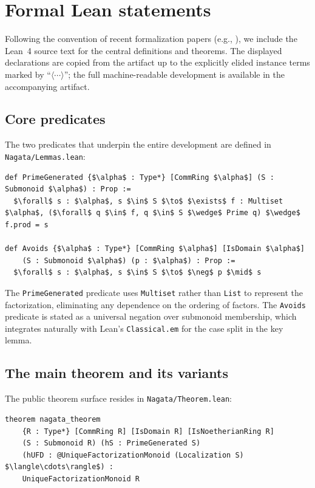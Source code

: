 \documentclass[11pt]{article}
\theoremstyle{plain}
\theoremstyle{definition}
\theoremstyle{remark}
\newcommand{\li}[1]{\texorpdfstring{\texttt{#1}}{#1}}
\newcommand{\lf}[1]{\texorpdfstring{\nolinkurl{#1}}{#1}}
\begin{document}
\section{Formal Lean statements}\label{sec:lean-statements}

Following the convention of recent formalization papers (e.g.,
\cite{brasca-flt,riou-derived,loeffler-zeta}), we include the Lean~4 source
text for the central definitions and theorems.  The displayed declarations are
copied from the artifact up to the explicitly elided instance terms marked by
``$\langle\cdots\rangle$''; the full machine-readable development is available
in the accompanying artifact.

\subsection{Core predicates}

The two predicates that underpin the entire development are defined in
\lf{Nagata/Lemmas.lean}:

\begin{lstlisting}[style=lean]
def PrimeGenerated {$\alpha$ : Type*} [CommRing $\alpha$] (S : Submonoid $\alpha$) : Prop :=
  $\forall$ s : $\alpha$, s $\in$ S $\to$ $\exists$ f : Multiset $\alpha$, ($\forall$ q $\in$ f, q $\in$ S $\wedge$ Prime q) $\wedge$ f.prod = s

def Avoids {$\alpha$ : Type*} [CommRing $\alpha$] [IsDomain $\alpha$]
    (S : Submonoid $\alpha$) (p : $\alpha$) : Prop :=
  $\forall$ s : $\alpha$, s $\in$ S $\to$ $\neg$ p $\mid$ s
\end{lstlisting}

\noindent
The \li{PrimeGenerated} predicate uses \li{Multiset} rather than \li{List} to
represent the factorization, eliminating any dependence on the ordering of
factors.  The \li{Avoids} predicate is stated as a universal negation over
submonoid membership, which integrates naturally with Lean's \li{Classical.em}
for the case split in the key lemma.

\subsection{The main theorem and its variants}

The public theorem surface resides in \lf{Nagata/Theorem.lean}:

\begin{lstlisting}[style=lean]
theorem nagata_theorem
    {R : Type*} [CommRing R] [IsDomain R] [IsNoetherianRing R]
    (S : Submonoid R) (hS : PrimeGenerated S)
    (hUFD : @UniqueFactorizationMonoid (Localization S) $\langle\cdots\rangle$) :
    UniqueFactorizationMonoid R
\end{lstlisting}
\end{document}
